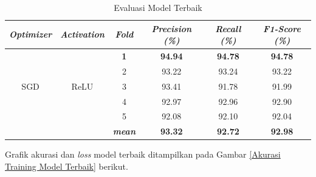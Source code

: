     \begin{table}[H]
        \centering
        \caption{Evaluasi Model Terbaik}
        \begin{tabular}{cccccc}
            \toprule
            \textbf{\textit{Optimizer}} & \textbf{\textit{Activation}} &
            \multicolumn{1}{c}{\textit{\textbf{Fold}}} & \textbf{\textit{Precision (\%) } } & \textbf{\textit{Recall (\%)}} & \textbf{\textit{F1-Score (\%)}}\\
        
            \midrule
            \multirow{5}{*}{SGD} & \multirow{5}{*}{ReLU} 
            & \textbf{ 1 }& \textbf{94.94} & \textbf{94.78} & \textbf{94.78} \\
            & & 2 & 93.22 & 93.24 & 93.22 \\
            & & 3 & 93.41 & 91.78 & 91.99 \\
            & & 4 & 92.97 & 92.96 & 92.90 \\
            & & 5 & 92.08 & 92.10 & 92.04  \\
            & &\multirow{1}{*}{\textit{\textbf{mean}}} & \textbf{93.32} & \textbf{92.72} &\textbf{92.98} \\ 

            
            \bottomrule
        \end{tabular}
        \label{Evaluasi Model Terbaik}
    \end{table}


    Grafik akurasi dan \textit{loss} model terbaik ditampilkan pada Gambar \ref{Akurasi Training Model Terbaik} berikut. 


